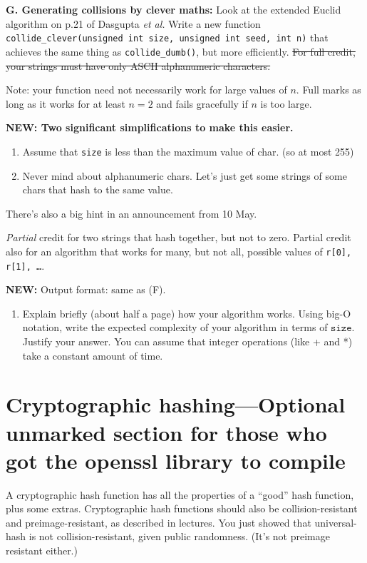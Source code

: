 \documentclass[11pt]{article}
\newcommand{\size}{{\texttt{size}}}
\begin{document}
\begin{description}
\item{\bf G. Generating collisions by clever maths:}
    Look at the extended Euclid algorithm on p.21 of Dasgupta {\it et al.}
        Write a new function
        \texttt{collide\_clever(unsigned int size, unsigned int seed, int n)}
        that achieves the same thing as \texttt{collide\_dumb()},
        but more efficiently.
        \sout{For full credit,
        your strings must have only ASCII alphanumeric characters.}

       Note: your function need not necessarily work for large values of $n$.  Full marks as long as it works for
       at least $n=2$ and fails gracefully if $n$ is too large.
\end{description}

{\bf NEW\@: Two significant simplifications to make this easier.}
\begin{enumerate}
\item Assume that \texttt{size} is less than the maximum value of char.  (so at most 255)

\item Never mind about alphanumeric chars.  Let's just  get some strings of some chars that hash to the same value.
\end{enumerate}

There's also a big hint in an announcement from 10 May.

\emph{Partial} credit for two strings that hash together, but not to zero.
Partial credit also for an algorithm that works for many, but not all, possible values of \texttt{r[0], r[1], \ldots}.

{\bf NEW\@: } Output format: same as (F).

\begin{enumerate}[resume]
\item
    Explain briefly (about half a page) how your algorithm works.  Using big-O notation, write the expected complexity of your algorithm in terms of $\size$.
        Justify your answer.
        You can assume that integer operations (like + and *) take a constant amount of time.
\end{enumerate}

\section*{Cryptographic hashing---Optional unmarked section for those who got the openssl library to compile}
A cryptographic hash function has all the properties of a ``good'' hash function, plus some extras.
Cryptographic hash functions should also be collision-resistant and preimage-resistant,
as described in lectures.
You just showed that  universal-hash is not collision-resistant, given public randomness.
(It's not preimage resistant either.)
\end{document}
